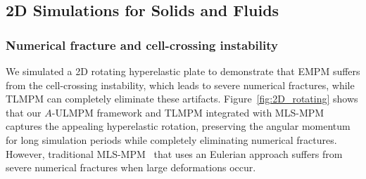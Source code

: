 \subsection{2D Simulations for Solids and Fluids}
\subsubsection{Numerical fracture and cell-crossing instability}
We simulated a 2D rotating hyperelastic plate to demonstrate that EMPM suffers from the cell-crossing instability, which leads to severe numerical fractures, while TLMPM can completely eliminate these artifacts. Figure~\ref{fig:2D_rotating} shows that our $A$-ULMPM framework and TLMPM integrated with MLS-MPM captures the appealing hyperelastic rotation, preserving the angular momentum for long simulation periods while completely eliminating numerical fractures. However, traditional MLS-MPM~\cite{Hu:2018:Moving} that uses an Eulerian approach suffers from severe numerical fractures when large deformations occur. 

